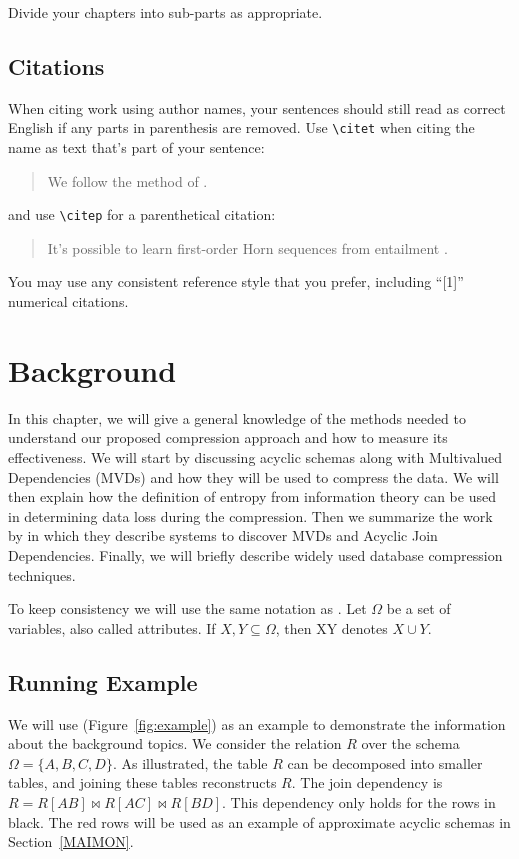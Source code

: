 \documentclass[logo,bsc,singlespacing,parskip,online]{infthesis}
\begin{document}
Divide your chapters into sub-parts as appropriate.

\section{Citations}

When citing work using author names, your sentences should still read
as correct English if any parts in parenthesis are removed.
Use {\tt {\textbackslash}citet} when citing the name as text that's part of your sentence: 
\begin{quote}
  We follow the method of \citet{P1}.
\end{quote}
and use {\tt {\textbackslash}citep} for a parenthetical citation:
\begin{quote}
  It's possible to learn first-order Horn sequences from entailment \citep{P2}.
\end{quote}

You may use any consistent reference style that you prefer, including ``[1]'' numerical citations. 

\chapter{Background}

In this chapter, we will give a general knowledge of the methods needed to understand our proposed compression approach and how to measure its effectiveness. We will start by discussing acyclic schemas along with Multivalued Dependencies (MVDs) and how they will be used to compress the data. We will then explain how the definition of entropy from information theory can be used in determining data loss during the compression. Then we summarize the work by \citet{DBLP:conf/sigmod/KenigMPSS20} in which they describe systems to discover MVDs and Acyclic Join Dependencies. Finally, we will briefly describe widely used database compression techniques. 

To keep consistency we will use the same notation as \citet{DBLP:conf/sigmod/KenigMPSS20}. Let $\Omega$ be a set of variables, also called attributes. If $X , Y \subseteq  \Omega$, then XY denotes $X \cup  Y $.

\section{Running Example}

We will use (Figure~\ref{fig:example}) as an example to demonstrate the information about the background topics. We consider the relation $R$ over the schema $\Omega = \{A,B,C,D\}$. As illustrated, the table $R$ can be decomposed into smaller tables, and joining these tables reconstructs $R$. The join dependency is $R = R[AB] \bowtie R[AC] \bowtie R[BD]$. This dependency only holds for the rows in black. The red rows will be used as an example of approximate acyclic schemas in Section~\ref{MAIMON}.
\end{document}
